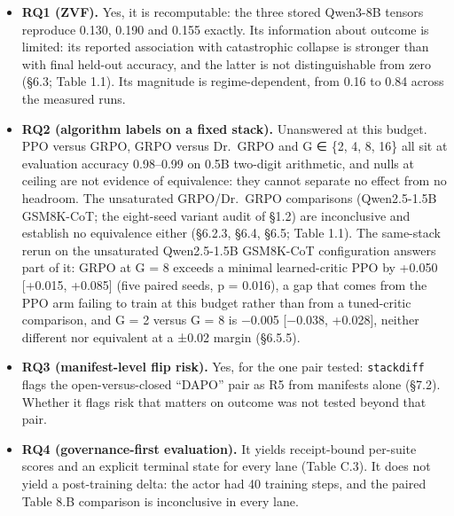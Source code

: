 \documentclass[12pt,a4paper]{report}
\providecommand{\tightlist}{%
  \setlength{\itemsep}{0pt}\setlength{\parskip}{0pt}}
\begin{document}
\begin{itemize}
\tightlist
\item
  \textbf{RQ1 (ZVF).} Yes, it is recomputable: the three stored Qwen3-8B
  tensors reproduce 0.130, 0.190 and 0.155 exactly. Its information
  about outcome is limited: its reported association with catastrophic
  collapse is stronger than with final held-out accuracy, and the latter
  is not distinguishable from zero (§6.3; Table 1.1). Its magnitude is
  regime-dependent, from 0.16 to 0.84 across the measured runs.
\item
  \textbf{RQ2 (algorithm labels on a fixed stack).} Unanswered at this
  budget. PPO versus GRPO, GRPO versus Dr.~GRPO and G ∈ \{2, 4, 8, 16\}
  all sit at evaluation accuracy 0.98--0.99 on 0.5B two-digit
  arithmetic, and nulls at ceiling are not evidence of equivalence: they
  cannot separate no effect from no headroom. The unsaturated
  GRPO/Dr.~GRPO comparisons (Qwen2.5-1.5B GSM8K-CoT; the eight-seed
  variant audit of §1.2) are inconclusive and establish no equivalence
  either (§6.2.3, §6.4, §6.5; Table 1.1). The same-stack rerun on the
  unsaturated Qwen2.5-1.5B GSM8K-CoT configuration answers part of it:
  GRPO at G = 8 exceeds a minimal learned-critic PPO by +0.050
  {[}+0.015, +0.085{]} (five paired seeds, p = 0.016), a gap that comes
  from the PPO arm failing to train at this budget rather than from a
  tuned-critic comparison, and G = 2 versus G = 8 is −0.005 {[}−0.038,
  +0.028{]}, neither different nor equivalent at a ±0.02 margin
  (§6.5.5).
\item
  \textbf{RQ3 (manifest-level flip risk).} Yes, for the one pair tested:
  \texttt{stackdiff} flags the open-versus-closed ``DAPO'' pair as R5
  from manifests alone (§7.2). Whether it flags risk that matters on
  outcome was not tested beyond that pair.
\item
  \textbf{RQ4 (governance-first evaluation).} It yields receipt-bound
  per-suite scores and an explicit terminal state for every lane (Table
  C.3). It does not yield a post-training delta: the actor had 40
  training steps, and the paired Table 8.B comparison is inconclusive in
  every lane.
\end{itemize}
\end{document}
